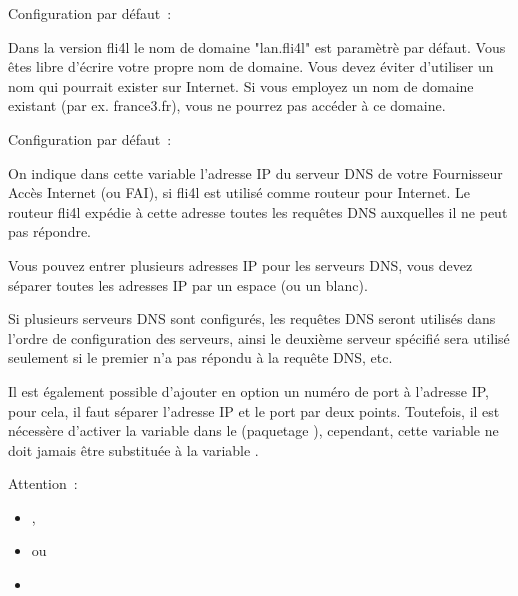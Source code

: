   \begin{description}

    Configuration par défaut~: 

      {Dans la version fli4l le nom de domaine "lan.fli4l" est paramètrè par 
      défaut. Vous êtes libre d'écrire votre propre nom de domaine. Vous devez
      éviter d'utiliser un nom qui pourrait exister sur Internet.
      Si vous employez un nom de domaine existant (par ex. france3.fr), vous ne
      pourrez pas accéder à ce domaine.}


    Configuration par défaut~: 

      {On indique dans cette variable l'adresse IP du serveur DNS de votre
      Fournisseur Accès Internet (ou FAI), si fli4l est utilisé comme routeur
      pour Internet. Le routeur fli4l expédie à cette adresse toutes les
      requêtes DNS auxquelles il ne peut pas répondre.

      Vous pouvez entrer plusieurs adresses IP pour les serveurs DNS, vous devez
      séparer toutes les adresses IP par un espace (ou un blanc).

      Si plusieurs serveurs DNS sont configurés, les requêtes DNS seront utilisés
	  dans l'ordre de configuration des serveurs, ainsi le deuxième serveur spécifié
	  sera utilisé seulement si le premier n'a pas répondu à la requête DNS, etc.

      Il est également possible d'ajouter en option un numéro de port à
      l'adresse IP, pour cela, il faut séparer l'adresse IP et le port par deux
      points. Toutefois, il est nécessère d'activer la variable
       dans le (paquetage
      ), cependant, cette variable
      ne doit jamais être substituée à la variable .

      Attention~:
        \begin{itemize}
        \item {},
        \item {}
        ou
        \item {}
        \end{itemize}

}
\end{description}
